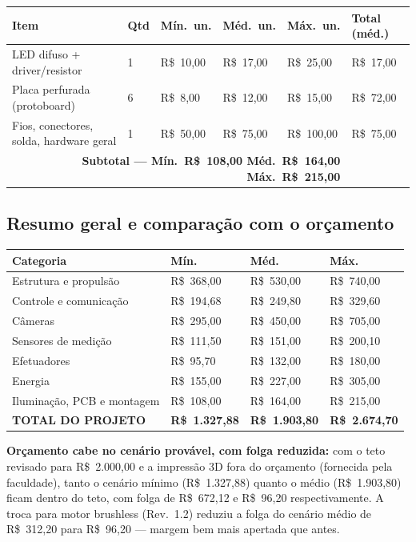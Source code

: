 \documentclass[11pt,a4paper]{article}
\newcommand{\destaque}[2]{%
  \par\noindent\colorbox{voltbandbg}{%
    \begin{minipage}{\dimexpr\linewidth-2\fboxsep\relax}
      \vspace{0.3em}
      \textcolor{voltcyan}{\textbf{#1}} #2
      \vspace{0.3em}
    \end{minipage}%
  }\par\vspace{1em}
}
\begin{document}
\begin{longtable}{@{}p{5.4cm}p{0.9cm}p{1.7cm}p{1.7cm}p{1.7cm}p{2.1cm}@{}}
\toprule
\textbf{Item} & \textbf{Qtd} & \textbf{Mín.\ un.} & \textbf{Méd.\ un.} & \textbf{Máx.\ un.} & \textbf{Total (méd.)} \\
\midrule
\endhead
\bottomrule
\endfoot
LED difuso + driver/resistor & 1 & R\$~10,00 & R\$~17,00 & R\$~25,00 & R\$~17,00 \\
Placa perfurada (protoboard) & 6 & R\$~8,00 & R\$~12,00 & R\$~15,00 & R\$~72,00 \\
Fios, conectores, solda, hardware geral & 1 & R\$~50,00 & R\$~75,00 & R\$~100,00 & R\$~75,00 \\
\midrule
\multicolumn{5}{r}{\textbf{Subtotal — Mín.\ R\$~108,00 \quad Méd.\ R\$~164,00 \quad Máx.\ R\$~215,00}} & \\
\end{longtable}

\subsection{Resumo geral e comparação com o orçamento}

\begin{longtable}{@{}p{6.5cm}p{2.3cm}p{2.3cm}p{2.3cm}@{}}
\toprule
\textbf{Categoria} & \textbf{Mín.} & \textbf{Méd.} & \textbf{Máx.} \\
\midrule
\endhead
\bottomrule
\endfoot
Estrutura e propulsão & R\$~368,00 & R\$~530,00 & R\$~740,00 \\
Controle e comunicação & R\$~194,68 & R\$~249,80 & R\$~329,60 \\
Câmeras & R\$~295,00 & R\$~450,00 & R\$~705,00 \\
Sensores de medição & R\$~111,50 & R\$~151,00 & R\$~200,10 \\
Efetuadores & R\$~95,70 & R\$~132,00 & R\$~180,00 \\
Energia & R\$~155,00 & R\$~227,00 & R\$~305,00 \\
Iluminação, PCB e montagem & R\$~108,00 & R\$~164,00 & R\$~215,00 \\
\midrule
\textbf{TOTAL DO PROJETO} & \textbf{R\$~1.327,88} & \textbf{R\$~1.903,80} & \textbf{R\$~2.674,70} \\
\end{longtable}

\destaque{Orçamento cabe no cenário provável, com folga reduzida:}{com o teto revisado para R\$~2.000,00 e a impressão 3D fora do orçamento (fornecida pela faculdade), tanto o cenário mínimo (R\$~1.327,88) quanto o médio (R\$~1.903,80) ficam dentro do teto, com folga de R\$~672,12 e R\$~96,20 respectivamente. A troca para motor brushless (Rev.~1.2) reduziu a folga do cenário médio de R\$~312,20 para R\$~96,20 — margem bem mais apertada que antes.}
\end{document}
